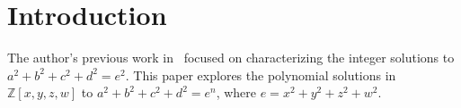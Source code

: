 \documentclass[12pt,table]{article}
\theoremstyle{definition}
\theoremstyle{remark}
\newcommand{\Zzz}{\mathbb Z}
\numberwithin{equation}{section}
\begin{document}
\begin{appendices}
\begin{comment}
$3.5^2+ 5.5^2+ 9.5^2+ 12.5^2  = 17^2$ \>$0$\\
$3.5^2+ 5.5^2+ 15.5^2+ 18.5^2  = 25^2$ \>$0$\\
$3.5^2+ 5.5^2+ 17.5^2+ 19.5^2  = 27^2$ \>$0$\\
$3.5^2+ 6.5^2+ 6.5^2+ 8.5^2  = 13^2$ \>$60$\\
$3.5^2+ 6.5^2+ 11.5^2+ 18.5^2  = 23^2$ \>$0$\\
$3.5^2+ 7.5^2+ 10.5^2+ 10.5^2  = 17^2$ \>$36$\\
$3.5^2+ 7.5^2+ 10.5^2+ 13.5^2  = 19^2$ \>$0$\\
$3.5^2+ 7.5^2+ 11.5^2+ 15.5^2  = 21^2$ \>$24$\\
$3.5^2+ 8.5^2+ 8.5^2+ 11.5^2  = 17^2$ \>$60$\\
$4.5^2+ 4.5^2+ 7.5^2+ 8.5^2  = 13^2$ \>$84$\\
$4.5^2+ 4.5^2+ 10.5^2+ 14.5^2  = 19^2$ \>$84$\\
$4.5^2+ 4.5^2+ 13.5^2+ 17.5^2  = 23^2$ \>$36$\\
$8.5^2+ 15.5^2+ 17.5^2+ 18.5^2  = 31^2$ \>$0$\\
$9.5^2+ 10.5^2+ 19.5^2+ 19.5^2  = 31^2$ \>$36$\\
$9.5^2+ 12.5^2+ 14.5^2+ 16.5^2  = 27^2$ \>$48$\\
$10.5^2+ 10.5^2+ 11.5^2+ 16.5^2  = 25^2$ \>$36$\\
$10.5^2+ 12.5^2+ 12.5^2+ 17.5^2  = 27^2$ \>$36$\\
$10.5^2+ 16.5^2+ 16.5^2+ 17.5^2  = 31^2$ \>$36$\\
$11.5^2+ 16.5^2+ 18.5^2+ 18.5^2  = 33^2$ \>$36$\\
$12.5^2+ 12.5^2+ 17.5^2+ 18.5^2  = 31^2$ \>$84$\\
$12.5^2+ 14.5^2+ 18.5^2+ 19.5^2  = 33^2$ \>$48$\\
\end{tabbing}
}

\end{comment}


\end{appendices}






\section{Introduction}


The author's previous work in~\cite{Ehrenborg_2018}
focused on characterizing the
integer solutions to
$a^2 + b^2 + c^2 + d^2 = e^2$.
This paper explores the polynomial solutions
in $ \Zzz[x,y,z,w] $ to
$a^2 + b^2 + c^2 + d^2 = e^n$, where
$e = x^2 + y^2 + z^2 + w^2$.
\end{document}
